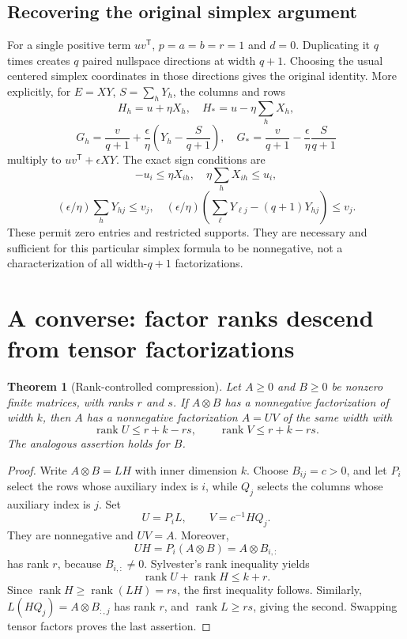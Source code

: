 \documentclass[11pt]{article}
\newtheorem{theorem}{Theorem}[section]
\theoremstyle{definition}\newtheorem{definition}[theorem]{Definition}
\theoremstyle{remark}\newtheorem{remark}[theorem]{Remark}
\newcommand{\rk}{\operatorname{rank}}
\begin{document}
\subsection{Recovering the original simplex argument}
For a single positive term $uv^{\mathsf T}$, $p=a=b=r=1$ and $d=0$. Duplicating it $q$ times creates $q$ paired nullspace directions at width $q+1$. Choosing the usual centered simplex coordinates in those directions gives the original identity. More explicitly, for $E=XY$, $S=\sum_hY_h$, the columns and rows
\[
H_h=u+\eta X_h,\quad H_*=u-\eta\sum_hX_h,
\]
\[
G_h=\frac v{q+1}+\frac\epsilon\eta\left(Y_h-\frac S{q+1}\right),
\quad G_*=\frac v{q+1}-\frac\epsilon\eta\frac S{q+1}
\]
multiply to $uv^{\mathsf T}+\epsilon XY$. The exact sign conditions are
\[
-u_i\le\eta X_{ih},\quad \eta\sum_hX_{ih}\le u_i,
\]
\[
(\epsilon/\eta)\sum_hY_{hj}\le v_j,\quad
(\epsilon/\eta)\left(\sum_\ell Y_{\ell j}-(q+1)Y_{hj}\right)\le v_j.
\]
These permit zero entries and restricted supports. They are necessary and sufficient for this particular simplex formula to be nonnegative, not a characterization of all width-$q+1$ factorizations.

\section{A converse: factor ranks descend from tensor factorizations}\label{sec:compression}

\begin{theorem}[Rank-controlled compression]\label{thm:compression}
Let $A\ge0$ and $B\ge0$ be nonzero finite matrices, with ranks $r$ and $s$. If $A\otimes B$ has a nonnegative factorization of width $k$, then $A$ has a nonnegative factorization $A=UV$ of the same width with
\begin{equation}\label{eq:compress}
\rk U\le r+k-rs,\qquad\rk V\le r+k-rs.
\end{equation}
The analogous assertion holds for $B$.
\end{theorem}

\begin{proof}
Write $A\otimes B=LH$ with inner dimension $k$. Choose $B_{ij}=c>0$, and let $P_i$ select the rows whose auxiliary index is $i$, while $Q_j$ selects the columns whose auxiliary index is $j$. Set
\[
U=P_iL,\qquad V=c^{-1}HQ_j.
\]
They are nonnegative and $UV=A$. Moreover,
\[
UH=P_i(A\otimes B)=A\otimes B_{i,:}
\]
has rank $r$, because $B_{i,:}\ne0$. Sylvester's rank inequality yields
\[
\rk U+\rk H\le k+r.
\]
Since $\rk H\ge\rk(LH)=rs$, the first inequality follows. Similarly, $L(HQ_j)=A\otimes B_{:,j}$ has rank $r$, and $\rk L\ge rs$, giving the second. Swapping tensor factors proves the last assertion.
\end{proof}
\end{document}
